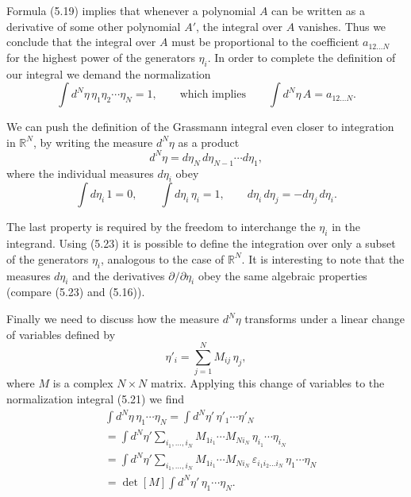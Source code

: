 Formula (5.19) implies that whenever a polynomial $A$ can be written as a
derivative of some other polynomial $A'$, the integral over $A$ vanishes. Thus
we conclude that the integral over $A$ must be proportional to the coefficient
$a_{12\ldots N}$ for the highest power of the generators $\eta_i$. In order to complete the
definition of our integral we demand the normalization
\begin{equation}
  \int d^N\eta\,\eta_1\eta_2\cdots\eta_N = 1 ,
  \qquad \text{which implies} \qquad
  \int d^N\eta\,A = a_{12\ldots N} .
\end{equation}

We can push the definition of the Grassmann integral even closer to integration in $\mathbb{R}^N$, by writing the measure $d^N\eta$ as a product
\begin{equation}
  d^N\eta = d\eta_N\,d\eta_{N-1}\cdots d\eta_1 ,
\end{equation}
where the individual measures $d\eta_i$ obey
\begin{equation}
  \int d\eta_i\,1 = 0, \qquad
  \int d\eta_i\,\eta_i = 1, \qquad
  d\eta_i\,d\eta_j = -d\eta_j\,d\eta_i .
\end{equation}

The last property is required by the freedom to interchange the $\eta_i$ in the
integrand. Using (5.23) it is possible to define the integration over only a
subset of the generators $\eta_i$, analogous to the case of $\mathbb{R}^N$. It is interesting to
note that the measures $d\eta_i$ and the derivatives $\partial/\partial\eta_i$ obey the same algebraic
properties (compare (5.23) and (5.16)).

Finally we need to discuss how the measure $d^N\eta$ transforms under a linear
change of variables defined by
\begin{equation}
  \eta'_i = \sum_{j=1}^{N}M_{ij}\,\eta_j ,
\end{equation}
where $M$ is a complex $N \times N$ matrix. Applying this change of variables to
the normalization integral (5.21) we find
\begin{equation}
  \begin{aligned}
    &\int d^N\eta\,\eta_1\cdots\eta_N
     = \int d^N\eta'\,\eta'_1\cdots\eta'_N\\
    &= \int d^N\eta'\sum_{i_1,\ldots,i_N}M_{1i_1}\cdots M_{Ni_N}\,
       \eta_{i_1}\cdots\eta_{i_N}\\
    &= \int d^N\eta'\sum_{i_1,\ldots,i_N}M_{1i_1}\cdots M_{Ni_N}\,
      \varepsilon_{i_1i_2\ldots i_N}\,\eta_1\cdots\eta_N\\
    &= \det[M]\int d^N\eta'\,\eta_1\cdots\eta_N .
  \end{aligned}
\end{equation}

